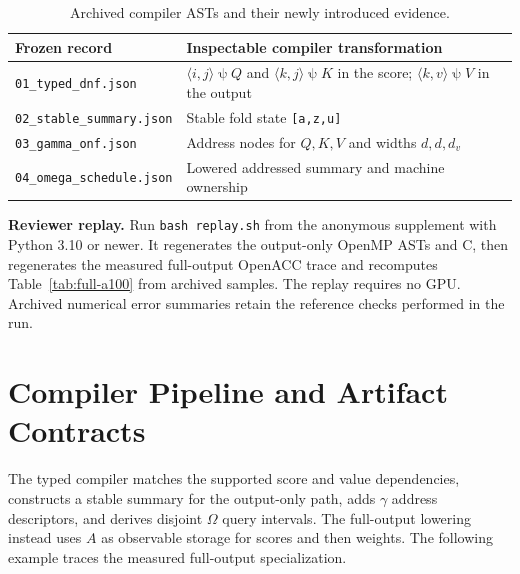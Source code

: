 \documentclass[sigplan,10pt,review,balance=false,pbalance=false]{acmart}
\newcommand{\ps}{\mathbin{\psi}}
\begin{document}
\begin{table}[t]
\centering\footnotesize
\caption{Archived compiler ASTs and their newly introduced evidence.}\label{tab:actual-asts}
\begin{tabular}{@{}p{}p{}@{}}\toprule
Frozen record & Inspectable compiler transformation \\\midrule
\texttt{01\_typed\_dnf.json} & $\langle i,j\rangle\ps Q$ and $\langle k,j\rangle\ps K$ in the score; $\langle k,v\rangle\ps V$ in the output \\
\texttt{02\_stable\_summary.json} & Stable fold state \texttt{[a,z,u]} \\
\texttt{03\_gamma\_onf.json} & Address nodes for $Q,K,V$ and widths $d,d,d_v$ \\
\texttt{04\_omega\_schedule.json} & Lowered addressed summary and machine ownership \\\bottomrule
\end{tabular}
\end{table}

\noindent\textbf{Reviewer replay.} Run \nolinkurl{bash replay.sh} from the anonymous supplement with Python 3.10 or newer. It regenerates the output-only OpenMP ASTs and C, then regenerates the measured full-output OpenACC trace and recomputes Table~\ref{tab:full-a100} from archived samples. The replay requires no GPU. Archived numerical error summaries retain the reference checks performed in the run.

\section{Compiler Pipeline and Artifact Contracts}
The typed compiler matches the supported score and value dependencies, constructs a stable summary for the output-only path, adds $\gamma$ address descriptors, and derives disjoint $\Omega$ query intervals. The full-output lowering instead uses $A$ as observable storage for scores and then weights. The following example traces the measured full-output specialization.
\end{document}
